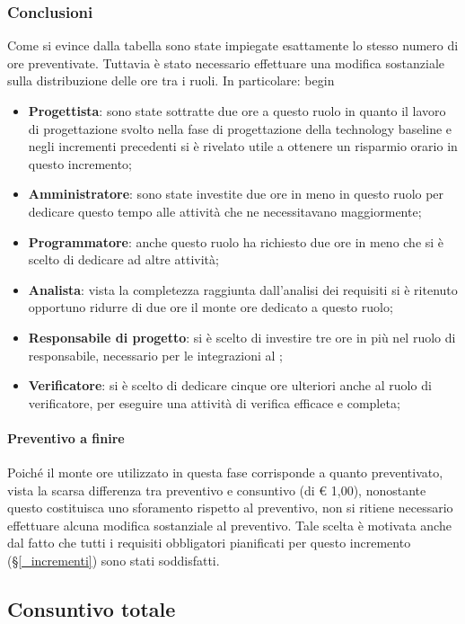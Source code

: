 \subsubsection{Conclusioni}
Come si evince dalla tabella sono state impiegate esattamente lo stesso numero di ore preventivate. Tuttavia è stato necessario effettuare una modifica sostanziale sulla distribuzione delle ore tra i ruoli. In particolare:
begin\begin{itemize}
	\item \textbf{Progettista}: sono state sottratte due ore a questo ruolo in quanto il lavoro di progettazione svolto nella fase di progettazione della technology baseline e negli incrementi precedenti si è rivelato utile a ottenere un risparmio orario in questo incremento;
	\item \textbf{Amministratore}: sono state investite due ore in meno in questo ruolo per dedicare questo tempo alle attività che ne necessitavano maggiormente;
	\item \textbf{Programmatore}: anche questo ruolo ha richiesto due ore in meno che si è scelto di dedicare ad altre attività;
	\item \textbf{Analista}: vista la completezza raggiunta dall'analisi dei requisiti si è ritenuto opportuno ridurre di due ore il monte ore dedicato a questo ruolo;
	\item \textbf{Responsabile di progetto}: si è scelto di investire tre ore in più nel ruolo di responsabile, necessario per le integrazioni al ;
	\item \textbf{Verificatore}: si è scelto di dedicare cinque ore ulteriori anche al ruolo di verificatore, per eseguire una attività di verifica efficace e completa;
\end{itemize} 

\paragraph{Preventivo a finire}
Poiché il monte ore utilizzato in questa fase corrisponde a quanto preventivato, vista la scarsa differenza tra preventivo e consuntivo (di € 1,00), nonostante questo costituisca uno sforamento rispetto al preventivo, non si ritiene necessario effettuare alcuna modifica sostanziale al preventivo. Tale scelta è motivata anche dal fatto che tutti i requisiti obbligatori pianificati per questo incremento (\S\ref{_incrementi}) sono stati soddisfatti. 


\subsection{Consuntivo totale}\label{riepilogoPAF}

